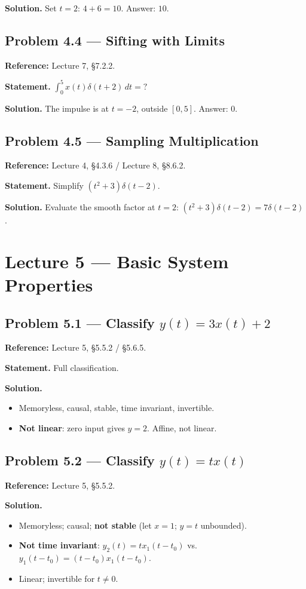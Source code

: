 \documentclass[11pt]{article}
\begin{document}
\textbf{Solution.} Set $t=2$: $4+6=10$. Answer: $\boxed{10}$.

\subsection{Problem 4.4 --- Sifting with Limits}
\textbf{Reference:} Lecture 7, \S 7.2.2.

\textbf{Statement.} $\displaystyle\int_0^5 x(t)\delta(t+2)\,dt = ?$

\textbf{Solution.} The impulse is at $t=-2$, outside $[0,5]$. Answer: $\boxed{0}$.

\subsection{Problem 4.5 --- Sampling Multiplication}
\textbf{Reference:} Lecture 4, \S 4.3.6 / Lecture 8, \S 8.6.2.

\textbf{Statement.} Simplify $(t^2+3)\delta(t-2)$.

\textbf{Solution.} Evaluate the smooth factor at $t=2$: $(t^2+3)\delta(t-2) = 7\delta(t-2)$.

\section{Lecture 5 --- Basic System Properties}

\subsection{Problem 5.1 --- Classify $y(t)=3x(t)+2$}
\textbf{Reference:} Lecture 5, \S 5.5.2 / \S 5.6.5.

\textbf{Statement.} Full classification.

\textbf{Solution.}
\begin{itemize}[leftmargin=*]
  \item Memoryless, causal, stable, time invariant, invertible.
  \item \textbf{Not linear}: zero input gives $y=2$. Affine, not linear.
\end{itemize}

\subsection{Problem 5.2 --- Classify $y(t)=tx(t)$}
\textbf{Reference:} Lecture 5, \S 5.5.2.

\textbf{Solution.}
\begin{itemize}[leftmargin=*]
  \item Memoryless; causal; \textbf{not stable} (let $x=1$; $y=t$ unbounded).
  \item \textbf{Not time invariant}: $y_2(t)=tx_1(t-t_0)$ vs.\ $y_1(t-t_0)=(t-t_0)x_1(t-t_0)$.
  \item Linear; invertible for $t\ne 0$.
\end{itemize}
\end{document}
